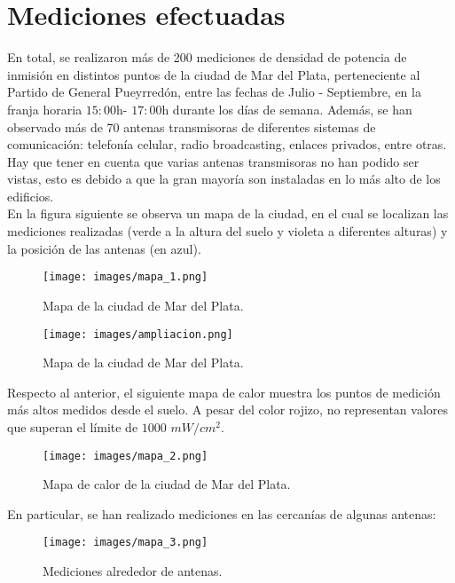 \section{Mediciones efectuadas}
En total, se realizaron más de 200 mediciones de densidad de potencia de inmisión en distintos puntos de la ciudad de Mar del Plata, perteneciente al Partido de General Pueyrredón, entre las fechas de Julio - Septiembre, en la franja horaria $15:00$h- $17:00$h durante los días de semana. Además, se han observado más de 70 antenas transmisoras de diferentes sistemas de comunicación: telefonía celular, radio broadcasting, enlaces privados, entre otras. Hay que tener en cuenta que varias antenas transmisoras no han podido ser vistas, esto es debido a que la gran mayoría son instaladas en lo más alto de los edificios.\\

En la figura siguiente se observa un mapa de la ciudad, en el cual se localizan las mediciones realizadas (verde a la altura del suelo y violeta a diferentes alturas) y la posición de las antenas (en azul). \\

\begin{figure}[H]
\centering
\texttt{[image: images/mapa\_1.png]}
\caption{Mapa de la ciudad de Mar del Plata.}
\label{4.1}
\end{figure}

\begin{figure}[H]
\centering
\texttt{[image: images/ampliacion.png]}
\caption{Mapa de la ciudad de Mar del Plata.}
\label{4.12}
\end{figure}

Respecto al anterior, el siguiente mapa de calor muestra los puntos de medición más altos medidos desde el suelo. A pesar del color rojizo, no representan valores que superan el límite de $1000$ $mW/cm^2$.

\begin{figure}[H]
\centering
\texttt{[image: images/mapa\_2.png]}
\caption{Mapa de calor de la ciudad de Mar del Plata.}
\label{4.2}
\end{figure}

En particular, se han realizado mediciones en las cercanías de algunas antenas: 

\begin{figure}[H]
\centering
\texttt{[image: images/mapa\_3.png]}
\caption{Mediciones alrededor de antenas.}
\label{4.3}
\end{figure}


